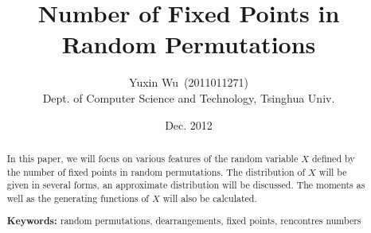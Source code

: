 \documentclass[a4paper]{article}
\title{Number of Fixed Points in Random Permutations}
\author{Yuxin Wu~(2011011271)\\Dept. of Computer Science and Technology, Tsinghua Univ.\\}
\date{Dec. 2012}
\begin{document}
\maketitle
\begin{abstract}
  In this paper, we will focus on various features of the random variable $X$
  defined by the number of fixed points in random permutations.
  The distribution of $X$ will be given in several forms, an approximate distribution will be discussed.
  The moments as well as the generating functions of $X$ will also be calculated.

  \textbf{Keywords:} random permutations, dearrangements, fixed points, rencontres numbers
\end{abstract}
\tableofcontents
\newpage







\nocite{inverse}
\nocite{set}
\nocite{bigbook}
\nocite{feller}
\nocite{textbook}
%
\printbibliography
\end{document}
